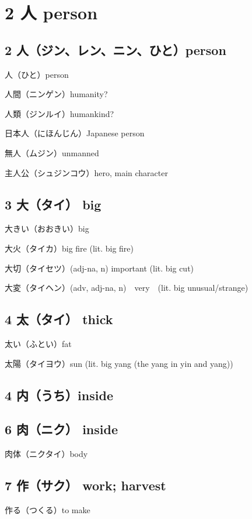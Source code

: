 \chapter{2 人 person}

\section{2 人（ジン、レン、ニン、ひと）person}

人（ひと）person

人間（ニンゲン）humanity?

人類（ジンルイ）humankind?

日本人（にほんじん）Japanese person

無人（ムジン）unmanned

主人公（シュジンコウ）hero, main character

\section{3 大（タイ） big}

大きい（おおきい）big

大火（タイカ）big fire (lit. big fire)

大切（タイセツ）(adj-na, n) important (lit. big cut)

大変（タイヘン）(adv, adj-na, n)　very　(lit. big unusual/strange)

\section{4 太（タイ） thick}

太い（ふとい）fat

太陽（タイヨウ）sun (lit. big yang (the yang in yin and yang))

\section{4 内（うち）inside}

\section{6 肉（ニク） inside}

肉体（ニクタイ）body

\section{7 作（サク） work; harvest}

作る（つくる）to make
